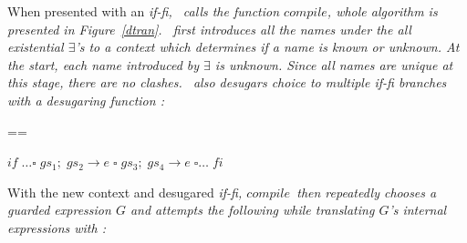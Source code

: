 \documentclass[manuscript,screen,review, 12pt, nonacm]{acmart}
\begin{document}
    \algrenewcommand{}
    \algrenewcommand{}
    \algrenewcommand{}
    \newcommand\alet\algorithmicwhile
    \newcommand\ain\algorithmicdo
    \newcommand\aend\algorithmicend

    \newcommand\branches{\ensuremath{\mathit{branches}}}
    \newcommand\compile{\ensuremath{\mathit{compile}}}
    \newcommand\mg{\ensuremath{-}}


    When presented with an \it{if-fi}, \DTran\ calls the function \compile,
    whole algorithm is presented in Figure~\ref{dtran}. \DTran\ first introduces
    all the names under the all existential $\exists$'s to a context which
    determines if a name is \it{known} or \it{unknown}. At the start, each name
    introduced by $\exists$ is \it{unknown}. Since all names are unique at this
    stage, there are no clashes. \DTran\ also desugars choice to multiple
    \it{if-fi} branches with a desugaring function \ITran: 

    
    ==
    
    ${if\; \dots \square\; gs_{1};\; gs_{2} \rightarrow e \;\square\; gs_{3};\; gs_{4} \rightarrow e \;\square \dots \;fi}$


    With the new context and desugared \it{if-fi}, \compile\ then repeatedly
    chooses a guarded expression $G$ and attempts the following while
    translating $G$'s internal expressions with \DTran: 
\end{document}
